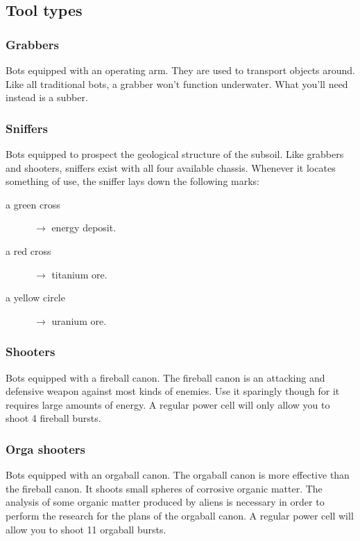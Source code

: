 
\subsection{Tool types}

\subsubsection{Grabbers}

Bots equipped with an operating arm. They are used to transport objects around. Like all traditional bots, a grabber won't function underwater. What you'll need instead is a subber.


\subsubsection{Sniffers}

Bots equipped to prospect the geological structure of the subsoil. Like grabbers and shooters, sniffers exist with all four available chassis. Whenever it locates something of use, the sniffer lays down the following marks:

\begin{description}
    \item[a green cross] $\rightarrow$ energy deposit.
    \item[a red cross] $\rightarrow$ titanium ore.
    \item[a yellow circle] $\rightarrow$ uranium ore.
\end{description}


\subsubsection{Shooters}

Bots equipped with a fireball canon. The fireball canon is an attacking and defensive weapon against most kinds of enemies. Use it sparingly though for it requires large amounts of energy. A regular power cell will only allow you to shoot 4 fireball bursts.


\subsubsection{Orga shooters}

Bots equipped with an orgaball canon. The orgaball canon is more effective than the fireball canon. It shoots small spheres of corrosive organic matter. The analysis of some organic matter produced by aliens is necessary in order to perform the research for the plans of the orgaball canon. A regular power cell will allow you to shoot 11 orgaball bursts.
